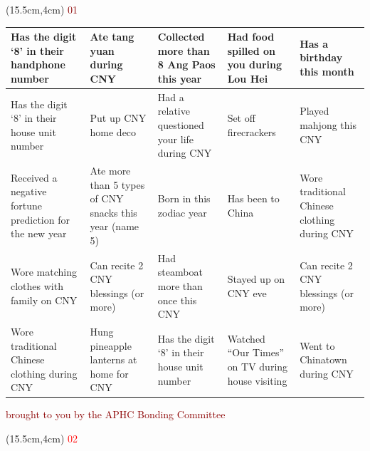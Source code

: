 \documentclass[20pt,A4]{article}
\begin{document}
\begin{textblock*}{3cm}(15.5cm,4cm)
   \Huge \textcolor{darkred}{01}
\end{textblock*}

\hphantom
\newline
\newline
\newline
\newline
\newline
\newline
\newline
\newline

\begin{center}
\large \bfseries
\begin{tabular}{| C{2.8cm}| C{2.8cm}| C{2.8cm}| C{2.8cm}| C{2.8cm}|} \hline  
Has the digit ‘8’ in their handphone number & Ate tang yuan during CNY &  Collected more than 8 Ang Paos this year  & Had food spilled on you during Lou Hei  & Has a birthday this month \\[2cm]
\hline 
 Has the digit ‘8’ in their house unit number & Put up CNY home deco & Had a relative questioned your life during CNY  & Set off firecrackers   & Played mahjong this CNY \\ [2cm]
\hline 
Received a negative fortune prediction for the new year & Ate more than 5 types of CNY snacks this year (name 5) & Born in this zodiac year  & Has been to China  & Wore traditional Chinese clothing during CNY \\ [2cm]
\hline 
 Wore matching clothes with family on CNY  & Can recite 2 CNY blessings (or more) & Had steamboat more than once this CNY  & Stayed up on CNY eve & Can recite 2 CNY blessings (or more) \\ [2cm]
\hline 
 Wore traditional Chinese clothing during CNY & Hung pineapple lanterns at home for CNY & Has the digit ‘8’ in their house unit number  & Watched “Our Times” on TV during house visiting  & Went to Chinatown during CNY \\ [2cm]
\hline 
 \end{tabular}
\end{center}

\centerline{\textcolor{darkred}{brought to you by the APHC Bonding Committee}}

\newpage

\begin{textblock*}{3cm}(15.5cm,4cm) 
   \Huge \textcolor{red}{02}
\end{textblock*}
\end{document}

